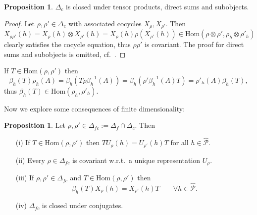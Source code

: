 \documentclass[12pt]{article}
\theoremstyle{definition}
\newtheorem{prop}[thm]{Proposition}
\theoremstyle{definition}
\theoremstyle{remark}
\def\2#1{{\mathcal #1}}
\newcommand{\Hom}{\mathrm{Hom}}
\begin{document}
\begin{prop} $\Delta_c$ is closed under tensor products, direct sums and subobjects.
\end{prop}

\begin{proof}
Let $\rho,\rho'\in\Delta_c$ with associated cocycles $X_\rho, X_{\rho'}$. Then
\begin{equation} \label{eq-Xtens}
  X_{\rho\rho'}(h)=X_{\rho}(h)\otimes
  X_{\rho'}(h)=X_{\rho}(h)\rho(X_{\rho'}(h))
  \in\Hom(\rho\otimes\rho',\rho_h\otimes\rho'_h)
\end{equation}
clearly satisfies the cocycle equation, thus
$\rho\rho'$ is covariant. The proof for direct sums and
subobjects is omitted, cf.\ \cite{rob-lec}.
\end{proof}

If $T\in\Hom(\rho,\rho')$ then 
\[
\beta_h(T)\rho_h(A)=\beta_h(T\rho\beta^{-1}_h(A))=\beta_h(\rho'\beta^{-1}_h(A)T)=\rho'_h(A)\beta_h(T), \]
thus $\beta_h(T)\in\Hom(\rho_h,\rho'_h)$.

Now we explore some consequences of finite dimensionality:

\begin{prop} \label{prop-intertw}
Let $\rho,\rho'\in\Delta_{fc}:=\Delta_f\cap\Delta_c$. Then 
\begin{itemize}
\item[(i)] If $T\in\Hom(\rho,\rho')$ then $TU_\rho(h)=U_{\rho'}(h)T$ for all $h\in\widehat{\2P}$. 
\item[(ii)] Every $\rho\in\Delta_{fc}$ is covariant w.r.t.\  a unique representation $U_\rho$.
\item[(iii)] If $\rho,\rho'\in\Delta_{fc}$ and $T\in\Hom(\rho,\rho')$ then 
\begin{equation}\label{eq-betaT} \beta_h(T)X_\rho(h)=X_{\rho'}(h)T\quad\quad\forall h\in\widehat{\2P}.
\end{equation}
\item[(iv)] $\Delta_{fc}$ is closed under conjugates.
\end{itemize}
\end{prop}
\end{document}
